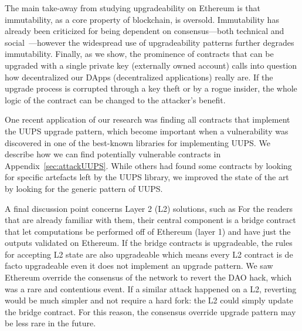 
The main take-away from studying upgradeability on Ethereum is that immutability, as a core property of blockchain, is oversold. Immutability has already been criticized for being dependent on consensus---both technical and social~\cite{walch2016path}---however the widespread use of upgradeability patterns further degrades immutability. Finally, as we show, the prominence of contracts that can be upgraded with a single private key (\ie externally owned account) calls into question how decentralized our DApps (decentralized applications) really are. If the upgrade process is corrupted through a key theft or by a rogue insider, the whole logic of the contract can be changed to the attacker's benefit. 

One recent application of our research was finding all contracts that implement the UUPS upgrade pattern, which become important when a vulnerability was discovered in one of the best-known libraries for implementing UUPS. We describe how we can find potentially vulnerable contracts in Appendix~\ref{sec:attackUUPS}. While others had found some contracts by looking for specific artefacts left by the UUPS library, we improved the state of the art by looking for the generic pattern of UUPS. 

A final discussion point concerns Layer 2 (L2) solutions, such as  For the readers that are already familiar with them, their central component is a bridge contract that let computations be performed off of Ethereum (layer 1) and have just the outputs validated on Ethereum. If the bridge contracts is upgradeable, the rules for accepting L2 state are also upgradeable which means every L2 contract is de facto upgradeable even it does not implement an upgrade pattern. We saw Ethereum override the consensus of the network to revert the DAO hack, which was a rare and contentious event. If a similar attack happened on a L2, reverting would be much simpler and not require a hard fork: the L2 could simply update the bridge contract. For this reason, the consensus override upgrade pattern may be less rare in the future. 

